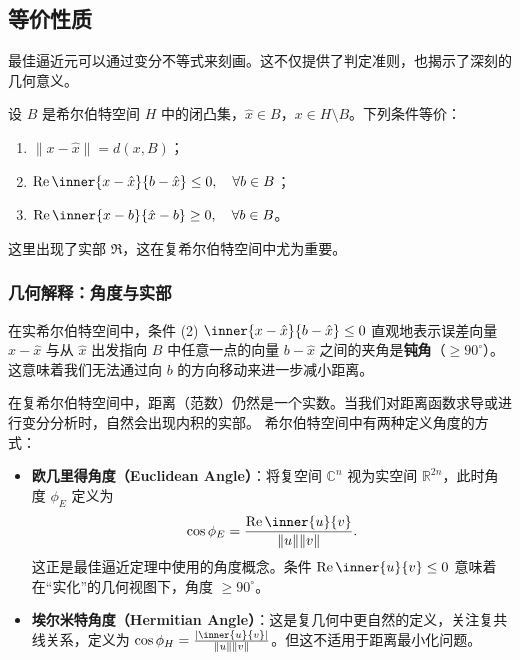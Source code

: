 \subsection{等价性质}

最佳逼近元可以通过变分不等式来刻画。这不仅提供了判定准则，也揭示了深刻的几何意义。

\begin{theorem}
    设 \(B\) 是希尔伯特空间 \(H\) 中的闭凸集，\(\hat{x} \in B\)，\(x \in H \setminus
    B\)。下列条件等价：
    \begin{enumerate}
        \item \(\|x - \hat{x}\| = d(x, B)\)；
        \item \(\Re\inner{x - \hat{x}}{b - \hat{x}} \le
            0, \quad \forall b \in B\)；
        \item \(\Re\inner{x - b}{\hat{x} - b} \ge 0,
            \quad \forall b \in B\)。
    \end{enumerate}
\end{theorem}

这里出现了实部 \(\Re\)，这在复希尔伯特空间中尤为重要。

\subsubsection{几何解释：角度与实部}

在实希尔伯特空间中，条件 (2) \(\inner{x - \hat{x}}{b - \hat{x}} \le 0\) 直观地表示误差向量
\(x - \hat{x}\) 与从 \(\hat{x}\) 出发指向 \(B\) 中任意一点的向量 \(b - \hat{x}\)
之间的夹角是\textbf{钝角}（\(\ge 90^\circ\)）。这意味着我们无法通过向 \(b\) 的方向移动来进一步减小距离。

在复希尔伯特空间中，距离（范数）仍然是一个实数。当我们对距离函数求导或进行变分分析时，自然会出现内积的实部。
希尔伯特空间中有两种定义角度的方式：
\begin{itemize}
    \item \textbf{欧几里得角度（Euclidean Angle）}：将复空间 \(\mathbb{C}^n\)
        视为实空间 \(\mathbb{R}^{2n}\)，此时角度 \(\phi_E\) 定义为
        \[ \cos \phi_E = \frac{\Re\inner{u}{v}}{\|u\|\|v\|}. \]
        这正是最佳逼近定理中使用的角度概念。条件 \(\Re\inner{u}{v} \le 0\)
        意味着在“实化”的几何视图下，角度 \(\ge 90^\circ\)。
    \item \textbf{埃尔米特角度（Hermitian Angle）}：这是复几何中更自然的定义，关注复共线关系，定义为
        \(\cos \phi_H = \frac{|\inner{u}{v}|}{\|u\|\|v\|}\)。但这不适用于距离最小化问题。
\end{itemize}

